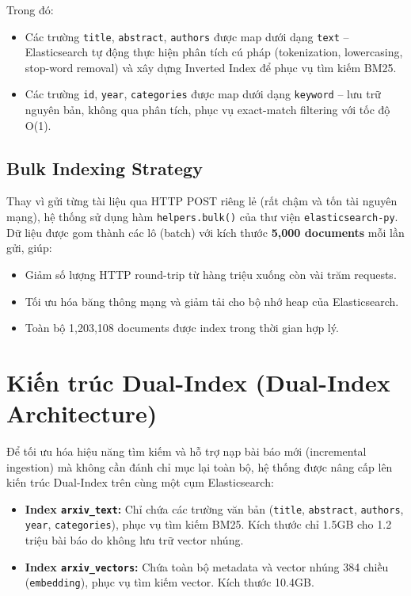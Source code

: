Trong đó:
\begin{itemize}
    \item Các trường \texttt{title}, \texttt{abstract}, \texttt{authors} được map dưới dạng \texttt{text} -- Elasticsearch tự động thực hiện phân tích cú pháp (tokenization, lowercasing, stop-word removal) và xây dựng Inverted Index để phục vụ tìm kiếm BM25.
    \item Các trường \texttt{id}, \texttt{year}, \texttt{categories} được map dưới dạng \texttt{keyword} -- lưu trữ nguyên bản, không qua phân tích, phục vụ exact-match filtering với tốc độ O(1).
\end{itemize}

\subsection{Bulk Indexing Strategy}
Thay vì gửi từng tài liệu qua HTTP POST riêng lẻ (rất chậm và tốn tài nguyên mạng), hệ thống sử dụng hàm \texttt{helpers.bulk()} của thư viện \texttt{elasticsearch-py}. Dữ liệu được gom thành các lô (batch) với kích thước \textbf{5,000 documents} mỗi lần gửi, giúp:
\begin{itemize}
    \item Giảm số lượng HTTP round-trip từ hàng triệu xuống còn vài trăm requests.
    \item Tối ưu hóa băng thông mạng và giảm tải cho bộ nhớ heap của Elasticsearch.
    \item Toàn bộ 1,203,108 documents được index trong thời gian hợp lý.
\end{itemize}

\section{Kiến trúc Dual-Index (Dual-Index Architecture)}
\label{sec:dual-index}

Để tối ưu hóa hiệu năng tìm kiếm và hỗ trợ nạp bài báo mới (incremental ingestion) mà không cần đánh chỉ mục lại toàn bộ, hệ thống được nâng cấp lên kiến trúc Dual-Index trên cùng một cụm Elasticsearch:

\begin{itemize}
    \item \textbf{Index \texttt{arxiv\_text}:} Chỉ chứa các trường văn bản (\texttt{title}, \texttt{abstract}, \texttt{authors}, \texttt{year}, \texttt{categories}), phục vụ tìm kiếm BM25. Kích thước chỉ 1.5GB cho 1.2 triệu bài báo do không lưu trữ vector nhúng.
    \item \textbf{Index \texttt{arxiv\_vectors}:} Chứa toàn bộ metadata và vector nhúng 384 chiều (\texttt{embedding}), phục vụ tìm kiếm vector. Kích thước 10.4GB.
\end{itemize}

